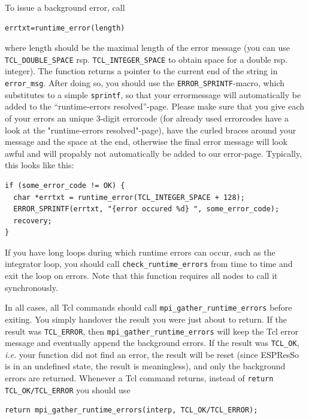 \documentclass[
a4paper,                        %
11pt,                           %
twoside,                        %
footsepline,                    %
headsepline,                    %
headexclude,                    %
footexclude,                    %
pagesize,                       %
bibtotocnumbered,               %
idxtotoc                        %
]{scrreprt}
\newcommand{\es}{\mbox{\textsf{ESPResSo}}\xspace}
\newcommand{\ie}{\textit{i.e.}\xspace}
\begin{document}
To issue a background error, call 
\begin{verbatim}
errtxt=runtime_error(length)
\end{verbatim}
where length should be the maximal length of the error message (you
can use \verb!TCL_DOUBLE_SPACE!  rsp. \verb!TCL_INTEGER_SPACE! to
obtain space for a double rsp. integer).  The function returns a
pointer to the current end of the string in \verb!error_msg!. After
doing so, you should use the \verb!ERROR_SPRINTF!-macro, which
substitutes to a simple \verb!sprintf!, so that your errormessage will
automatically be added to the ``runtime-errors resolved''-page. Please
make sure that you give each of your errors an unique 3-digit
errorcode (for already used errorcodes have a look at the
"runtime-errors resolved"-page), have the curled braces around your
message and the space at the end, otherwise the final error message
will look awful and will propably not automatically be added to our
error-page. Typically, this looks like this:
\begin{verbatim}
if (some_error_code != OK) {
  char *errtxt = runtime_error(TCL_INTEGER_SPACE + 128);
  ERROR_SPRINTF(errtxt, "{error occured %d} ", some_error_code);
  recovery;
}
\end{verbatim}

If you have long loops during which runtime errors can occur, such as
the integrator loop, you should call \verb!check_runtime_errors! from
time to time and exit the loop on errors. Note that this function
requires all nodes to call it synchronously.

In all cases, all Tcl commands should call
\verb!mpi_gather_runtime_errors! before exiting. You simply handover
the result you were just about to return. If the result was
\verb!TCL_ERROR!, then \verb!mpi_gather_runtime_errors! will keep the
Tcl error message and eventually append the background errors. If the
result was \verb!TCL_OK!, \ie your function did not find an error, the
result will be reset (since \es is in an undefined state, the result
is meaningless), and only the background errors are returned. Whenever
a Tcl command returns, instead of \verb!return TCL_OK/TCL_ERROR! you should
use 
\begin{verbatim}
return mpi_gather_runtime_errors(interp, TCL_OK/TCL_ERROR); 
\end{verbatim}
\end{document}
